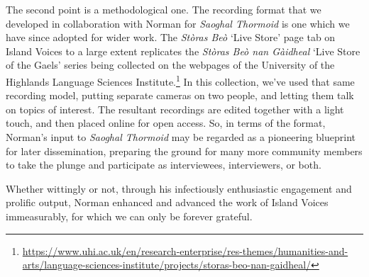 \documentclass[output=paper,colorlinks,citecolor=brown]{langscibook}
\begin{document}
The second point is a methodological one. The recording format that we developed in collaboration with Norman for \textit{Saoghal Thormoid} \citep{gw:Wells2017} is one which we have since adopted for wider work. The \textit{Stòras Beò} ‘Live Store’ page tab on Island Voices to a large extent replicates the \textit{Stòras Beò nan Gàidheal} ‘Live Store of the Gaels’ series being collected on the webpages of the University of the Highlands Language Sciences Institute.\footnote{\url{https://www.uhi.ac.uk/en/research-enterprise/res-themes/humanities-and-arts/language-sciences-institute/projects/storas-beo-nan-gaidheal/}} In this collection, we’ve used that same recording model, putting separate cameras on two people, and letting them talk on topics of interest. The resultant recordings are edited together with a light touch, and then placed online for open access. So, in terms of the format, Norman’s input to \textit{Saoghal Thormoid} may be regarded as a pioneering blueprint for later dissemination, preparing the ground for many more community members to take the plunge and participate as interviewees, interviewers, or both.

Whether wittingly or not, through his infectiously enthusiastic engagement and prolific output, Norman enhanced and advanced the work of Island Voices immeasurably, for which we can only be forever grateful.


\sloppy
\largerpage[2]
\printbibliography[heading=subbibliography,notkeyword=this] 
\end{document}
